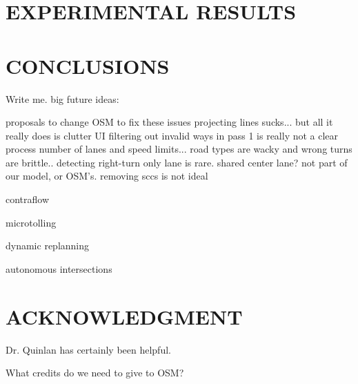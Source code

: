 \documentclass[letterpaper, 10 pt, conference]{ieeeconf}  %
\begin{document}
\section{EXPERIMENTAL RESULTS}



\section{CONCLUSIONS}

Write me. big future ideas:

proposals to change OSM to fix these issues
  projecting lines sucks... but all it really does is clutter UI
  filtering out invalid ways in pass 1 is really not a clear process
  number of lanes and speed limits... road types are wacky and wrong
  turns are brittle.. detecting right-turn only lane is rare. shared center lane?
    not part of our model, or OSM's.
  removing sccs is not ideal

contraflow

microtolling

dynamic replanning

autonomous intersections

\addtolength{\textheight}{-12cm}  %


\section*{ACKNOWLEDGMENT}

Dr. Quinlan has certainly been helpful.

What credits do we need to give to OSM?








\end{document}
